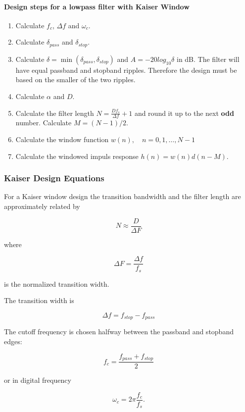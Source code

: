 \paragraph{Design steps for a lowpass filter with Kaiser Window}
\begin{enumerate}
\item Calculate $f_c$, $\Delta f$ and $\omega_c$.
\item Calculate $\delta_{pass}$ and $\delta_{stop}$.
\item Calculate $\delta=\min(\delta_{pass},\delta_{stop})$ and $A=-20log_{10}\delta$ in dB. \newline
	  The filter will have equal passband and stopband ripples. Therefore the design must be based on the smaller of the two ripples.
\item Calculate $\alpha$ and $D$.
\item Calculate the filter length $N=\frac{Df_s}{\Delta f}+1$ and round it up to the next \textbf{odd} number. Calculate $M=(N-1)/2$.
\item Calculate the window function $w(n),\quad n=0,1,\dots,N-1$
\item Calculate the windowed impuls response $h(n)=w(n)d(n-M)$.
\end{enumerate}

\subsubsection{Kaiser Design Equations}

For a Kaiser window design the transition bandwidth and the filter
length are approximately related by

\[
\boxed{
N \approx \frac{D}{\Delta F}
}
\]

where

\[
\Delta F=\frac{\Delta f}{f_s}
\]

is the normalized transition width.

The transition width is

\[
\boxed{
\Delta f=f_{stop}-f_{pass}
}
\]

The cutoff frequency is chosen halfway between the passband and
stopband edges:

\[
\boxed{
f_c=\frac{f_{pass}+f_{stop}}{2}
}
\]

or in digital frequency

\[
\omega_c
=
2\pi\frac{f_c}{f_s}.
\]

